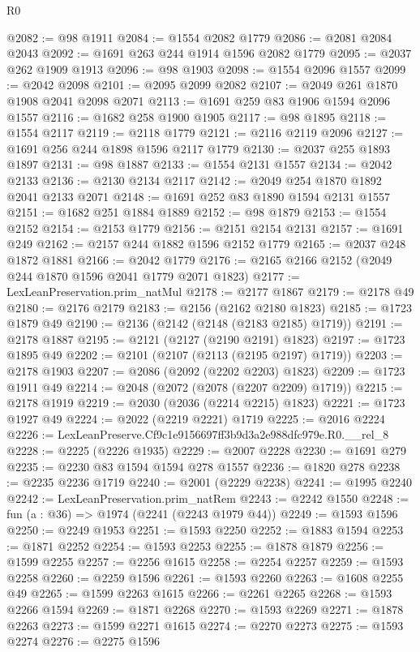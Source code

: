\begin{lexlean}{R0}
\begin{coremodule}
@2082 := @98 @1911
@2084 := @1554 @2082 @1779
@2086 := @2081 @2084 @2043
@2092 := @1691 @263 @244 @1914 @1596 @2082 @1779
@2095 := @2037 @262 @1909 @1913
@2096 := @98 @1903
@2098 := @1554 @2096 @1557
@2099 := @2042 @2098
@2101 := @2095 @2099 @2082
@2107 := @2049 @261 @1870 @1908 @2041 @2098 @2071
@2113 := @1691 @259 @83 @1906 @1594 @2096 @1557
@2116 := @1682 @258 @1900 @1905
@2117 := @98 @1895
@2118 := @1554 @2117
@2119 := @2118 @1779
@2121 := @2116 @2119 @2096
@2127 := @1691 @256 @244 @1898 @1596 @2117 @1779
@2130 := @2037 @255 @1893 @1897
@2131 := @98 @1887
@2133 := @1554 @2131 @1557
@2134 := @2042 @2133
@2136 := @2130 @2134 @2117
@2142 := @2049 @254 @1870 @1892 @2041 @2133 @2071
@2148 := @1691 @252 @83 @1890 @1594 @2131 @1557
@2151 := @1682 @251 @1884 @1889
@2152 := @98 @1879
@2153 := @1554 @2152
@2154 := @2153 @1779
@2156 := @2151 @2154 @2131
@2157 := @1691 @249
@2162 := @2157 @244 @1882 @1596 @2152 @1779
@2165 := @2037 @248 @1872 @1881
@2166 := @2042 @1779
@2176 := @2165 @2166 @2152 (@2049 @244 @1870 @1596 @2041 @1779 @2071 @1823)
@2177 := LexLeanPreservation.prim_natMul
@2178 := @2177 @1867
@2179 := @2178 @49
@2180 := @2176 @2179
@2183 := @2156 (@2162 @2180 @1823)
@2185 := @1723 @1879 @49
@2190 := @2136 (@2142 (@2148 (@2183 @2185) @1719))
@2191 := @2178 @1887
@2195 := @2121 (@2127 (@2190 @2191) @1823)
@2197 := @1723 @1895 @49
@2202 := @2101 (@2107 (@2113 (@2195 @2197) @1719))
@2203 := @2178 @1903
@2207 := @2086 (@2092 (@2202 @2203) @1823)
@2209 := @1723 @1911 @49
@2214 := @2048 (@2072 (@2078 (@2207 @2209) @1719))
@2215 := @2178 @1919
@2219 := @2030 (@2036 (@2214 @2215) @1823)
@2221 := @1723 @1927 @49
@2224 := @2022 (@2219 @2221) @1719
@2225 := @2016 @2224
@2226 := LexLeanPreserve.Cf9c1e9156697ff3b9d3a2e988dfc979e.R0.__rel_8
@2228 := @2225 (@2226 @1935)
@2229 := @2007 @2228
@2230 := @1691 @279
@2235 := @2230 @83 @1594 @1594 @278 @1557
@2236 := @1820 @278
@2238 := @2235 @2236 @1719
@2240 := @2001 (@2229 @2238)
@2241 := @1995 @2240
@2242 := LexLeanPreservation.prim_natRem
@2243 := @2242 @1550
@2248 := fun (a : @36) => @1974 (@2241 (@2243 @1979 @44))
@2249 := @1593 @1596
@2250 := @2249 @1953
@2251 := @1593 @2250
@2252 := @1883 @1594
@2253 := @1871 @2252
@2254 := @1593 @2253
@2255 := @1878 @1879
@2256 := @1599 @2255
@2257 := @2256 @1615
@2258 := @2254 @2257
@2259 := @1593 @2258
@2260 := @2259 @1596
@2261 := @1593 @2260
@2263 := @1608 @2255 @49
@2265 := @1599 @2263 @1615
@2266 := @2261 @2265
@2268 := @1593 @2266 @1594
@2269 := @1871 @2268
@2270 := @1593 @2269
@2271 := @1878 @2263
@2273 := @1599 @2271 @1615
@2274 := @2270 @2273
@2275 := @1593 @2274
@2276 := @2275 @1596

\end{coremodule}
\end{lexlean}
